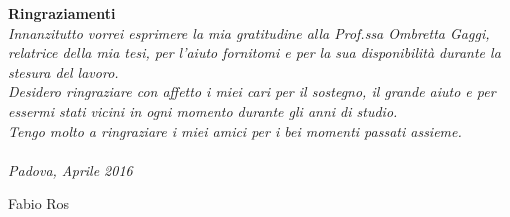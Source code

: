 \vspace*{100pt}
\noindent \textbf{\LARGE Ringraziamenti}\\

\noindent \textit{Innanzitutto vorrei esprimere la mia gratitudine alla Prof.ssa Ombretta Gaggi, relatrice della mia tesi, per l'aiuto fornitomi e per la sua disponibilità durante la stesura del lavoro.\\
Desidero ringraziare con affetto i miei cari per il sostegno, il grande aiuto e per essermi stati vicini in ogni momento durante gli anni di studio.\\
Tengo molto a ringraziare i miei amici per i bei momenti passati assieme.}\\
\mbox{}\\
\noindent \textit{Padova, Aprile 2016} \\
\begin{flushright}
	Fabio Ros
\end{flushright}